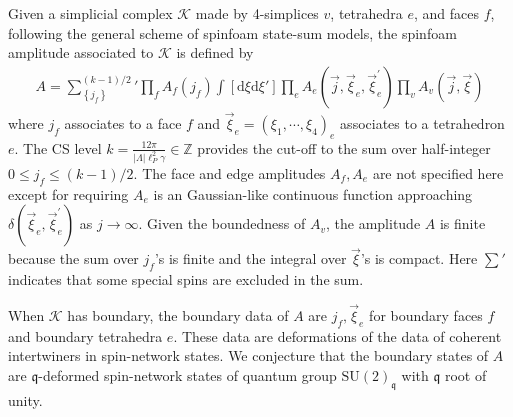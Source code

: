 \documentclass[aps,prd,notitlepage,nofootinbib,superscriptaddress,groupedaddress,twocolumn]{revtex4-1}
\newcommand{\Su}{\mathrm{SU}(2)}
\def\be{\begin{eqnarray}}
\def\ee{\end{eqnarray}}
\newcommand{\ck}{\mathcal K}
\newcommand{\fq}{\mathfrak{q}}  \newcommand{\Fq}{\mathfrak{Q}}
\newcommand{\g}{\gamma}
\renewcommand{\L }{\Lambda}
\newcommand{\rmd}{\mathrm d}
\begin{document}
Given a simplicial complex $\ck$ made by 4-simplices $v$, tetrahedra $e$, and faces $f$, following the general scheme of spinfoam state-sum models, the spinfoam amplitude associated to $\ck$ is defined by
\be
A=\!\!\!\sum_{\left\{j_{f}\right\}}^{(k-1) / 2}\!\!\!\!\!{}' \prod_{f} A_{f}\left(j_{f}\right) \int[\mathrm{d} \xi\rmd \xi'] \prod_{e} A_{e}\left(\vec{j}, \vec{\xi}_{e}, \vec{\xi}_{e}^{\prime}\right) \prod_{v} A_{v}(\vec{j}, \vec{\xi})\nonumber
\ee
where $j_f$ associates to a face $f$ and $\vec{\xi}_e=(\xi_1,\cdots,\xi_4)_e$ associates to a tetrahedron $e$. The CS level $k=\frac{12\pi}{|\L|\ell_P^2\g}\in\mathbb{Z}$ provides the cut-off to the sum over half-integer $0\leq j_f\leq (k-1)/2$. The face and edge amplitudes $A_f,A_e$ are not specified here except for requiring $A_e$ is an Gaussian-like continuous function approaching $\delta(\vec{\xi}_{e}, \vec{\xi}_{e}^{\prime})$ as $j\to\infty$. Given the boundedness of $A_v$, the amplitude $A$ is finite because the sum over $j_f$'s is finite and the integral over $\vec{\xi}$'s is compact. Here $\sum{}'$ indicates that some special spins are excluded in the sum.

When $\ck$ has boundary, the boundary data of $A$ are $j_f,\vec{\xi}_e$ for boundary faces $f$ and boundary tetrahedra $e$. These data are deformations of the data of coherent intertwiners in spin-network states. We conjecture that the boundary states of $A$ are $\fq$-deformed spin-network states of quantum group $\Su_{\fq}$ with $\fq$ root of unity.  
\end{document}
